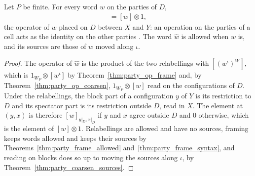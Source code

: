 \begin{theorem}
    \label{thm:party_op_on_cell}
    \leanok
    Let $P$ be finite. For every word $w$ on the parties of $D$,
    \begin{align}
        [\widehat w]=[w]\otimes1,
        \label{eq:party_op_on_cell}
    \end{align}
    the operator of $w$ placed on $D$ between $X$ and $Y$: an operation on the parties
    of a cell acts as the identity on the other parties
    \cite[Section~5.1]{OpenAI2026PolynomialPEPS}. The word $\widehat w$ is allowed
    when $w$ is, and its sources are those of $w$ moved along $\iota$.
\end{theorem}
\begin{proof}\leanok
    The operator of $\widehat w$ is the product of the two relabellings with
    $[(w^\iota)^W]$, which is $1_{W_P}\otimes[w^\iota]$ by
    Theorem~\ref{thm:party_op_frame} and, by Theorem~\ref{thm:party_op_coarsen},
    $1_{W_P}\otimes[w]$ read on the configurations of $D$. Under the relabellings, the
    block part of a configuration $y$ of $Y$ is its restriction to $D$ and its
    spectator part is its restriction outside $D$, read in $X$. The element at $(y,x)$
    is therefore $[w]_{y|_D,x|_D}$ if $y$ and $x$ agree outside $D$ and $0$ otherwise,
    which is the element of $[w]\otimes1$. Relabellings are allowed and have no
    sources, framing keeps words allowed and keeps their sources by
    Theorems~\ref{thm:party_frame_allowed} and~\ref{thm:party_frame_syntax}, and
    reading on blocks does so up to moving the sources along $\iota$, by
    Theorem~\ref{thm:party_coarsen_sources}.
\end{proof}
